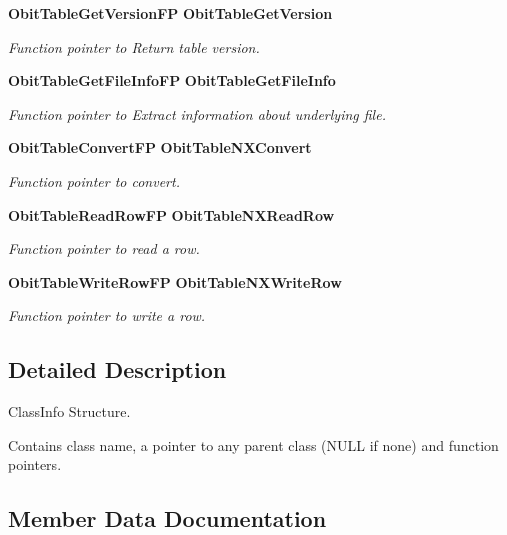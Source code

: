 \begin{CompactItemize}
{\bf Obit\-Table\-Get\-Version\-FP} {\bf Obit\-Table\-Get\-Version}
\begin{CompactList}\small\item\em Function pointer to Return table version. \item\end{CompactList}\item 
{\bf Obit\-Table\-Get\-File\-Info\-FP} {\bf Obit\-Table\-Get\-File\-Info}
\begin{CompactList}\small\item\em Function pointer to Extract information about underlying file. \item\end{CompactList}\item 
{\bf Obit\-Table\-Convert\-FP} {\bf Obit\-Table\-NXConvert}
\begin{CompactList}\small\item\em Function pointer to convert. \item\end{CompactList}\item 
{\bf Obit\-Table\-Read\-Row\-FP} {\bf Obit\-Table\-NXRead\-Row}
\begin{CompactList}\small\item\em Function pointer to read a row. \item\end{CompactList}\item 
{\bf Obit\-Table\-Write\-Row\-FP} {\bf Obit\-Table\-NXWrite\-Row}
\begin{CompactList}\small\item\em Function pointer to write a row. \item\end{CompactList}\end{CompactItemize}


\subsection{Detailed Description}
Class\-Info Structure. 

Contains class name, a pointer to any parent class (NULL if none) and function pointers. 



\subsection{Member Data Documentation}
